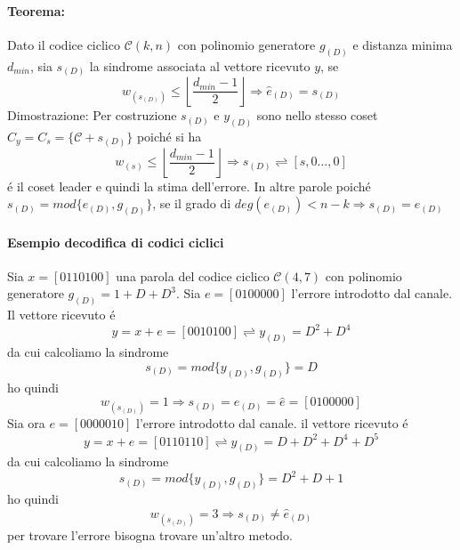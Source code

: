            \paragraph{Teorema:} Dato il codice ciclico $\mathcal{C}(k,n)$ con polinomio generatore $g_{(D)}$ e distanza minima 
            $d_{min}$, sia $s_{(D)}$ la sindrome associata al vettore ricevuto $y$, se 
            \[
                w_{(s_{(D)})}\leq \left\lfloor \frac{d_{min}-1}{2}\right\rfloor \Rightarrow \hat{e}_{(D)} = s_{(D)} 
            \]
            Dimostrazione: 
            Per costruzione $s_{(D)}$ e $y_{(D)}$ sono nello stesso coset $C_y= C_s = \{\mathcal{C}+s_{(D)}\}$ poiché si ha
            \[
                w_{(s)}\leq \left\lfloor \frac{d_{min}-1}{2}\right\rfloor \Rightarrow s_{(D)} \rightleftharpoons [s,0 \dots,0]   
            \]
            é il coset leader e quindi la stima dell'errore. In altre parole poiché $s_{(D)} = mod\{e_{(D)},g_{(D)}\}$, se il grado di
            $deg(e_{(D)})<n-k\Rightarrow s_{(D)} = e_{(D)}$ 
            \paragraph{Esempio decodifica di codici ciclici}
                Sia $x = [0110100]$ una parola del codice ciclico $\mathcal{C}(4,7)$ con polinomio generatore 
                $g_{(D)} = 1+D+D^3$. Sia $e = [0100000]$ l'errore introdotto dal canale. Il vettore ricevuto é 
                \[
                    y= x+e = [0010100]\rightleftharpoons y_{(D)} = D^2+D^4 
                \]
                da cui calcoliamo la sindrome 
                \[
                    s_{(D)} = mod\{y_{(D)},g_{(D)}\}=D
                \]
                ho quindi 
                \[
                    w_{(s_{(D)})} = 1\Rightarrow s_{(D)} =e_{(D)} = \hat{e} = [0100000]  
                \]
                Sia ora $e = [0000010]$ l'errore introdotto dal canale. il vettore ricevuto é 
                \[
                    y= x+e = [0110110]\rightleftharpoons y_{(D)} = D+D^2+D^4+D^5 
                \]
                da cui calcoliamo la sindrome 
                \[
                    s_{(D)} = mod\{y_{(D)},g_{(D)}\}=D^2+D+1
                \]
                ho quindi 
                \[
                    w_{(s_{(D)})} = 3\Rightarrow s_{(D)} \neq \hat{e}_{(D)}
                \]
                per trovare l'errore bisogna trovare un'altro metodo.
